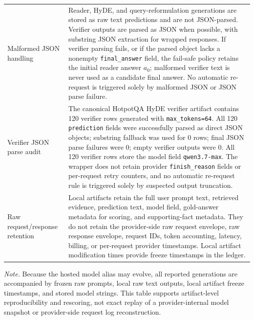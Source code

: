 \begin{longtable}{>{\raggedright\arraybackslash}p{}
                            >{\raggedright\arraybackslash}p{}}
Malformed JSON handling & Reader, HyDE, and query-reformulation generations are stored as raw text predictions and are not JSON-parsed. Verifier outputs are parsed as JSON when possible, with substring JSON extraction for wrapped responses. If verifier parsing fails, or if the parsed object lacks a nonempty \texttt{final\_answer} field, the fail-safe policy retains the initial reader answer $a_0$; malformed verifier text is never used as a candidate final answer. No automatic re-request is triggered solely by malformed JSON or JSON parse failure. \\
Verifier JSON parse audit & The canonical HotpotQA HyDE verifier artifact contains 120 verifier rows generated with \texttt{max\_tokens=64}. All 120 \texttt{prediction} fields were successfully parsed as direct JSON objects; substring fallback was used for 0 rows; final JSON parse failures were 0; empty verifier outputs were 0. All 120 verifier rows store the model field \texttt{qwen3.7-max}. The wrapper does not retain provider \texttt{finish\_reason} fields or per-request retry counters, and no automatic re-request rule is triggered solely by suspected output truncation. \\
Raw request/response retention & Local artifacts retain the full user prompt text, retrieved evidence, prediction text, model field, gold-answer metadata for scoring, and supporting-fact metadata. They do not retain the provider-side raw request envelope, raw response envelope, request IDs, token accounting, latency, billing, or per-request provider timestamps. Local artifact modification times provide freeze timestamps in the ledger. \\
\end{longtable}
\noindent\emph{Note.} Because the hosted model alias may evolve, all reported generations are accompanied by frozen raw prompts, local raw text outputs, local artifact freeze timestamps, and stored model strings. This table supports artifact-level reproducibility and rescoring, not exact replay of a provider-internal model snapshot or provider-side request log reconstruction.
\endgroup
